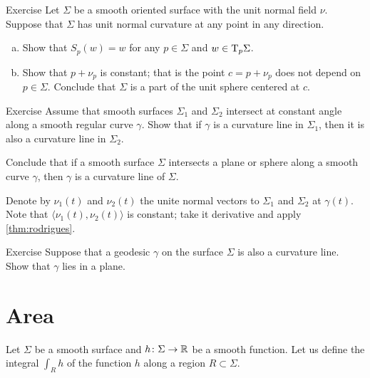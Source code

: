 \begin{thm}{Exercise}\label{ex:normal-curvature=const}
Let $\Sigma$ be a smooth oriented surface with the unit normal field $\nu$.
Suppose that $\Sigma$ has unit normal curvature at any point in any direction.
\begin{enumerate}[(a)]
 \item Show that $S_p(w)=w$ for any $p\in\Sigma$ and $w\in \mathrm{T}_p\Sigma$.
 \item Show that $p+\nu_p$ is constant; that is the point $c=p+\nu_p$ does not depend on $p\in\Sigma$.
 Conclude that $\Sigma$ is a part of the unit sphere centered at $c$.
\end{enumerate}

\end{thm}


\begin{thm}{Exercise}\label{ex:shape-curvature-line}
Assume that smooth surfaces $\Sigma_1$ and $\Sigma_2$ intersect at constant angle along a smooth regular curve $\gamma$.
Show that if $\gamma$ is a curvature line in $\Sigma_1$, then it is also a curvature line in $\Sigma_2$.

Conclude that if a smooth surface $\Sigma$ intersects a plane or sphere along a smooth curve $\gamma$,
then $\gamma$ is a curvature line of $\Sigma$.
\end{thm}

  Denote by $\nu_1(t)$ and $\nu_2(t)$ the unite normal vectors to $\Sigma_1$ and $\Sigma_2$ at $\gamma(t)$.
Note that $\langle \nu_1(t),\nu_2(t)\rangle$ is constant; take it derivative and apply \ref{thm:rodrigues}.

\begin{thm}{Exercise}\label{ex:geodesic-curvature-line}
Suppose that a geodesic $\gamma$ on the surface $\Sigma$ is also a curvature line.
Show that $\gamma$ lies in a plane.
\end{thm}

\section*{Area}


Let $\Sigma$ be a smooth surface and $h\colon\Sigma\to\mathbb{R}$ be a smooth function.
Let us define the integral $\int_R h$ of the function $h$ along a region $R\subset \Sigma$.

